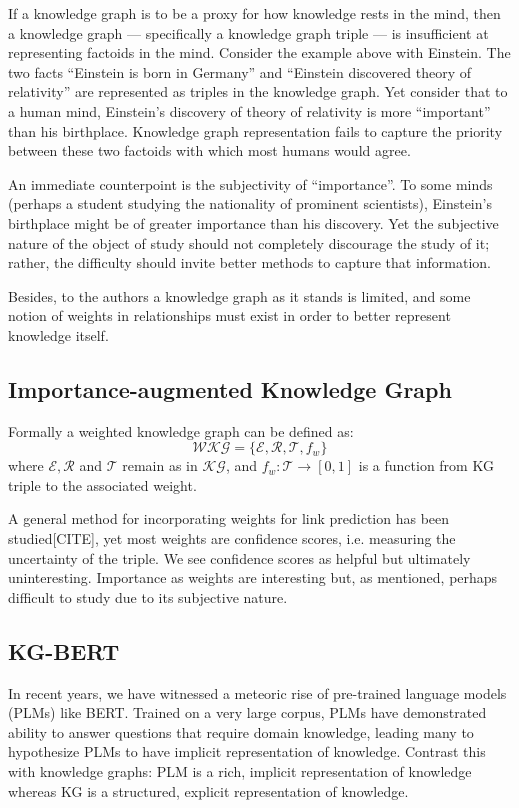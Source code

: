 \documentclass{article}
\begin{document}
If a knowledge graph is to be a proxy for how knowledge rests in the mind, then a knowledge graph --- specifically a knowledge graph triple --- is insufficient at representing factoids in the mind. Consider the example above with Einstein. The two facts ``Einstein is born in Germany'' and ``Einstein discovered theory of relativity'' are represented as triples in the knowledge graph. Yet consider that to a human mind, Einstein's discovery of theory of relativity is more ``important'' than his birthplace. Knowledge graph representation fails to capture the priority between these two factoids with which most humans would agree.

An immediate counterpoint is the subjectivity of ``importance''. To some minds (perhaps a student studying the nationality of prominent scientists), Einstein's birthplace might be of greater importance than his discovery. Yet the subjective nature of the object of study should not completely discourage the study of it; rather, the difficulty should invite better methods to capture that information.

Besides, to the authors a knowledge graph as it stands is limited, and some notion of weights in relationships must exist in order to better represent knowledge itself.

\subsection{Importance-augmented Knowledge Graph}
Formally a weighted knowledge graph can be defined as:
\begin{equation*}
  \mathcal{WKG} = \{\mathcal{E}, \mathcal{R}, \mathcal{T}, f_w\}
\end{equation*}
where $\mathcal{E}, \mathcal{R}$ and $\mathcal{T}$ remain as in $\mathcal{KG}$, and $f_w : \mathcal{T} \to [0,1]$ is a function from KG triple to the associated weight.

A general method for incorporating weights for link prediction has been studied[CITE], yet most weights are confidence scores, i.e. measuring the uncertainty of the triple. We see confidence scores as helpful but ultimately uninteresting. Importance as weights are interesting but, as mentioned, perhaps difficult to study due to its subjective nature.

\subsection{KG-BERT}
In recent years, we have witnessed a meteoric rise of pre-trained language models (PLMs) like BERT. Trained on a very large corpus, PLMs have demonstrated ability to answer questions that require domain knowledge, leading many to hypothesize PLMs to have implicit representation of knowledge. Contrast this with knowledge graphs: PLM is a rich, implicit representation of knowledge whereas KG is a structured, explicit representation of knowledge.
\end{document}
